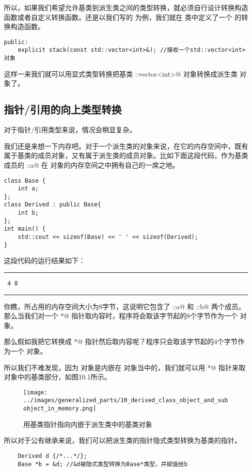 所以，如果我们希望允许基类到派生类之间的类型转换，就必须自行设计转换构造函数或者自定义转换函数。还是以我们写的 \lstinline@stack@ 为例，我们就在 \lstinline@stack@ 类中定义了一个 \lstinline@explicit@ 的转换构造函数。
\begin{lstlisting}
public:
    explicit stack(const std::vector<int>&); //接收一个std::vector<int>对象
\end{lstlisting}
这样一来我们就可以用显式类型转换把基类 \lstinline@std::vector<int>@ 对象转换成派生类 \lstinline@stack@ 对象了。\par
\subsection*{指针/引用的向上类型转换}
对于指针/引用类型来说，情况会稍显复杂。\par
我们还是来想一下内存吧。对于一个派生类的对象来说，在它的内存空间中，既有属于基类的成员对象，又有属于派生类的成员对象。比如下面这段代码，作为基类成员的 \lstinline@Base::a@ 在 \lstinline@Derive@ 对象的内存空间之中拥有自己的一席之地。
\begin{lstlisting}
class Base {
    int a;
};
class Derived : public Base{
    int b;
};
int main() {
    std::cout << sizeof(Base) << ' ' << sizeof(Derived);
}
\end{lstlisting}
这段代码的运行结果如下：\\\noindent\rule{\linewidth}{.2pt}\texttt{
4 8
}\\\noindent\rule{\linewidth}{.2pt}\par
你瞧，\lstinline@Derived@ 所占用的内存空间大小为8字节，这说明它包含了 \lstinline@Base::a@ 和 \lstinline@Derived::b@ 两个成员。那么当我们对一个 \lstinline@Derived*@ 指针取内容时，程序将会取该字节起的8个字节作为一个 \lstinline@Derived@ 对象。\par
那么假如我把它转换成 \lstinline@Base*@ 指针然后取内容呢？程序只会取该字节起的4个字节作为一个 \lstinline@Base@ 对象。\par
所以我们不难发现，因为 \lstinline@Base@ 对象是内嵌在 \lstinline@Derived@ 对象当中的，我们就可以用 \lstinline@Base*@ 指针来取 \lstinline@Derived@ 对象中的基类部分，如图10.1所示。
\begin{figure}[htbp]
    \centering
    \texttt{[image: ../images/generalized\_parts/10\_derived\_class\_object\_and\_subobject\_in\_memory.png]}
    \caption{用基类指针指向内嵌于派生类中的基类对象}
\end{figure}
所以对于公有继承来说，我们可以把派生类的指针隐式类型转换为基类的指针。
\begin{lstlisting}
    Derived d {/*...*/};
    Base *b = &d; //&d被隐式类型转换为Base*类型，并赋值给b
\end{lstlisting}\par
